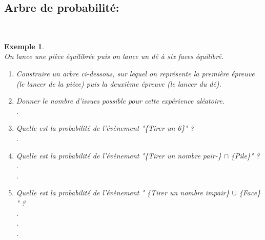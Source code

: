 \documentclass[a4paper,10.5pt]{article}
\newtheorem{defi}{Définition}
\newtheorem{ex}{Exemple}
\begin{document}
\subsection{Arbre de probabilité:}
\noindent{}
\hfill\\[-0.3cm]
\begin{ex}\hfill\\
	On lance une pièce équilibrée puis on lance un dé à six faces équilibré.\\[-0.25cm]  

	\begin{enumerate}
		\item Construire un arbre ci-dessous, sur lequel on représente la première épreuve (le lancer de la pièce) puis la deuxième épreuve (le lancer du dé).\\[10cm]
	
		\item Donner le nombre d'issues possible pour cette expérience aléatoire.\\[0.3cm]
		.\dotfill \\[0.1cm]
		\item Quelle est la probabilité de l'évènement "\{Tirer un 6\}" ?\\[0.3cm]
		.\dotfill \\[0.1cm]
		\item Quelle est la probabilité de l'évènement "\{Tirer un nombre pair-\} $\cap$ \{Pile\}" ?\\[0.3cm]
		.\dotfill \\[0.1cm].\dotfill \\[0.1cm]
		\item Quelle est la probabilité de l'évènement " \{Tirer un nombre impair\} $\cup$ \{Face\} " ? \\[0.3cm]
		.\dotfill \\[0.1cm].\dotfill \\[0.1cm].\dotfill \\[0.1cm]
	\end{enumerate}	 
\end{ex}
\end{document}
